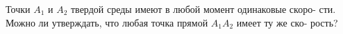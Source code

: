 Точки $A_{1}$ и $A_{2}$ твердой среды имеют в любой момент одинаковые скоро-
сти. Можно ли утверждать, что любая точка прямой $A_{1}$$A_{2}$ имеет ту же ско-
рость?

